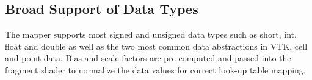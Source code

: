 
\subsection{Broad Support of Data Types}
\label{data-types}
The mapper supports most signed and unsigned data types such as short, int,
float and double as well as the two most common data abstractions in VTK,
cell and point data.  Bias and scale factors are pre-computed and passed into
the fragment shader to normalize the data values for correct look-up table
mapping.

